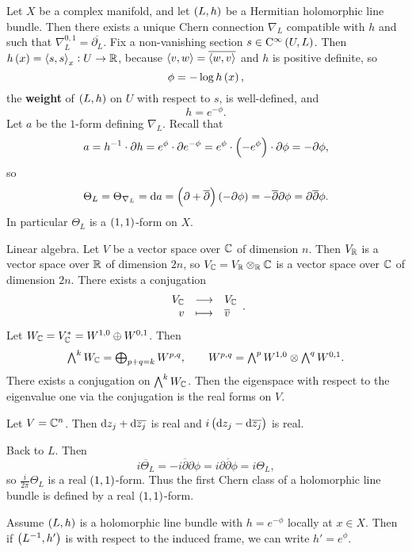 Let $ X $ be a complex manifold, and let $ \br{L, h} $ be a Hermitian holomorphic line bundle. Then there exists a unique Chern connection $ \nabla_L $ compatible with $ h $ and such that $ \nabla_L^{0, 1} = \overline{\partial_L} $. Fix a non-vanishing section $ s \in \C^\infty\br{U, L} $. Then $ h\br{x} = \abr{s, s}_x : U \to \RR $, because $ \left\langle v, w \right\rangle = \overline{\left\langle w, v \right\rangle} $ and $ h $ is positive definite, so
$$ \phi = -\log h\br{x}, $$
the \textbf{weight} of $ \br{L, h} $ on $ U $ with respect to $ s $, is well-defined, and
$$ h = e^{-\phi}. $$
Let $ a $ be the $ 1 $-form defining $ \nabla_L $. Recall that
$$ a = h^{-1} \cdot \partial h = e^\phi \cdot \partial e^{-\phi} = e^\phi \cdot \br{-e^{\phi}} \cdot \partial\phi = -\partial\phi, $$
so
$$ \Theta_L = \Theta_{\nabla_L} = \d a = \br{\partial + \overline{\partial}}\br{-\partial\phi} = -\overline{\partial}\partial\phi = \partial\overline{\partial}\phi. $$
In particular $ \Theta_L $ is a $ \br{1, 1} $-form on $ X $.

\begin{remark*}
Linear algebra. Let $ V $ be a vector space over $ \mathbb{C} $ of dimension $ n $. Then $ V_{\mathbb{R}} $ is a vector space over $ \mathbb{R} $ of dimension $ 2n $, so $ V_{\mathbb{C}} = V_{\mathbb{R}} \otimes_{\mathbb{R}} \mathbb{C} $ is a vector space over $ \mathbb{C} $ of dimension $ 2n $. There exists a conjugation
$$ \function{V_\CC}{V_\CC}{v}{\overline{v}}. $$
Let $ W_{\mathbb{C}} = V_{\mathbb{C}}^* = W^{1, 0} \oplus W^{0, 1} $. Then
$$ \textstyle\bigwedge^kW_{\mathbb{C}} = \bigoplus_{p + q = k} W^{p, q}, \qquad W^{p, q} = \textstyle\bigwedge^pW^{1, 0} \otimes \textstyle\bigwedge^qW^{0, 1}. $$
There exists a conjugation on $ \bigwedge^kW_{\mathbb{C}} $. Then the eigenspace with respect to the eigenvalue one via the conjugation is the real forms on $ V $.
\end{remark*}

\begin{example*}
Let $ V = \mathbb{C}^n $. Then $ \mathrm{d} z_j + \mathrm{d}\overline{z_j} $ is real and $ i\br{\d z_j - \d\overline{z_j}} $ is real.
\end{example*}

Back to $ L $. Then
$$ \overline{i\Theta_L} = -i\overline{\partial}\partial\phi = i\partial\overline{\partial}\phi = i\Theta_L, $$
so $ \tfrac{i}{2\pi}\Theta_L $ is a real $ \br{1, 1} $-form. Thus the first Chern class of a holomorphic line bundle is defined by a real $ \br{1, 1} $-form.

\begin{remark}
Assume $ \br{L, h} $ is a holomorphic line bundle with $ h = e^{-\phi} $ locally at $ x \in X $. Then if $ \br{L^{-1}, h'} $ is with respect to the induced frame, we can write $ h' = e^\phi $.
\end{remark}

